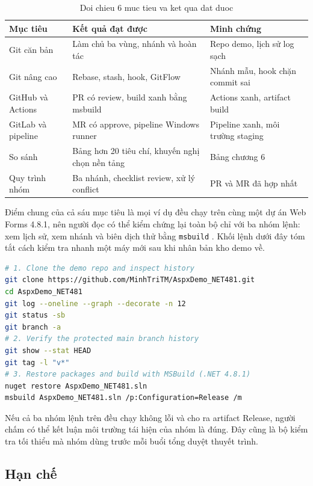 \begin{table}[H]
\centering
\begin{tabular}{p{2.6cm} p{5.2cm} p{5.2cm}}
\toprule
Mục tiêu & Kết quả đạt được & Minh chứng \\
\midrule
Git căn bản & Làm chủ ba vùng, nhánh và hoàn tác & Repo demo, lịch sử log sạch \\
Git nâng cao & Rebase, stash, hook, GitFlow & Nhánh mẫu, hook chặn commit sai \\
GitHub và Actions & PR có review, build xanh bằng msbuild & Actions xanh, artifact build \\
GitLab và pipeline & MR có approve, pipeline Windows runner & Pipeline xanh, môi trường staging \\
So sánh & Bảng hơn 20 tiêu chí, khuyến nghị chọn nền tảng & Bảng chương 6 \\
Quy trình nhóm & Ba nhánh, checklist review, xử lý conflict & PR và MR đã hợp nhất \\
\bottomrule
\end{tabular}
\caption{Doi chieu 6 muc tieu va ket qua dat duoc}
\label{tab:c8-doichieu}
\end{table}

Điểm chung của cả sáu mục tiêu là mọi ví dụ đều chạy trên cùng một dự án Web Forms 4.8.1, nên người đọc có thể kiểm chứng lại toàn bộ chỉ với ba nhóm lệnh: xem lịch sử, xem nhánh và biên dịch thử bằng \verb|msbuild| \cite{msnetfx,msmsbuild}.
Khối lệnh dưới đây tóm tắt cách kiểm tra nhanh một máy mới sau khi nhân bản kho demo về.

\begin{lstlisting}[language=bash]
# 1. Clone the demo repo and inspect history
git clone https://github.com/MinhTriTM/AspxDemo_NET481.git
cd AspxDemo_NET481
git log --oneline --graph --decorate -n 12
git status -sb
git branch -a
# 2. Verify the protected main branch history
git show --stat HEAD
git tag -l "v*"
# 3. Restore packages and build with MSBuild (.NET 4.8.1)
nuget restore AspxDemo_NET481.sln
msbuild AspxDemo_NET481.sln /p:Configuration=Release /m
\end{lstlisting}

Nếu cả ba nhóm lệnh trên đều chạy không lỗi và cho ra artifact Release, người chấm có thể kết luận môi trường tái hiện của nhóm là đúng.
Đây cũng là bộ kiểm tra tối thiểu mà nhóm dùng trước mỗi buổi tổng duyệt thuyết trình.

\subsection{Hạn chế}

